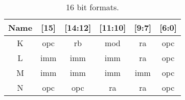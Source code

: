 \begin{table}[hbt!] %

    \begin{center}

    \begin{tabular}{|c|c|c|c|c|c|}

        \hline
        Name & [15] & [14:12] & [11:10] & [9:7] & [6:0]\\
        \hline
        \addlinespace[10pt]
        \hline
        K & opc & rb & mod & ra & opc \\
        \hline
        L & imm & imm & imm & ra & opc \\
        \hline
        M & imm & imm & imm & imm & opc \\
        \hline
        N & opc & opc & ra & ra & opc \\
        \hline

    \end{tabular}

    \caption[16 bit formats]{16 bit formats.}

    \end{center}

\end{table}